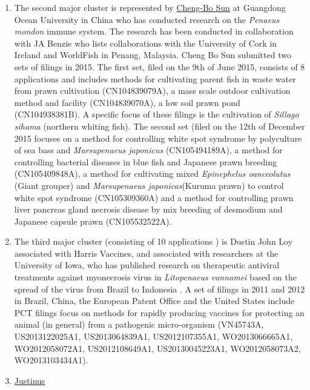 \documentclass[]{book}
\theoremstyle{definition}
\theoremstyle{definition}
\theoremstyle{definition}
\theoremstyle{remark}
\begin{document}
\begin{enumerate}
\def\labelenumi{\arabic{enumi}.}
\setcounter{enumi}{1}
\item
  The second major cluster is represented by
  \href{https://www.researchgate.net/scientific-contributions/2040070693_Cheng-Bo_Sun}{Cheng-Bo
  Sun} at Guangdong Ocean University in China who has conducted research
  on the \emph{Penaeus mondon} immune system. The research has been
  conducted in collaboration with JA Benzie who lists collaborations
  with the University of Cork in Ireland and WorldFish in Penang,
  Malaysia. Cheng Bo Sun submitted two sets of filings in 2015. The
  first set, filed on the 9th of June 2015, consists of 8 applications
  and includes methods for cultivating parent fish in waste water from
  prawn cultivation (CN104839079A), a mass scale outdoor cultivation
  method and facility (CN104839070A), a low soil prawn pond
  (CN104938381B). A specific focus of these filings is the cultivation
  of \emph{Sillago sihama} (northern whiting fish). The second set
  (filed on the 12th of December 2015 focuses on a method for
  controlling white spot syndrome by polyculture of sea bass and
  \emph{Marsupenaeus japonicus} (CN105494189A), a method for controlling
  bacterial diseases in blue fish and Japanese prawn breeding
  (CN105409848A), a method for cultivating mixed \emph{Epinephelus
  oanceolutus} (Giant grouper) and \emph{Marsupenaeus japonicas}(Kuruma
  prawn) to control white spot syndrome (CN105309360A) and a method for
  controlling prawn liver pancreas gland necrosis disease by mix
  breeding of desmodium and Japanese capsule prawn (CN105532522A).
\item
  The third major cluster (consisting of 10 applications ) is Dustin
  John Loy associated with Harris Vaccines, and associated with
  researchers at the University of Iowa, who has published research on
  therapeutic antiviral treatments against myonecrosis virus in
  \emph{Litopenaeus vannamei} based on the spread of the virus from
  Brazil to Indonesia \citep{Loy_2012, Loy_2013}. A set of filings in
  2011 and 2012 in Brazil, China, the European Patent Office and the
  United States include PCT filings focus on methods for rapidly
  producing vaccines for protecting an animal (in general) from a
  pathogenic micro-organism (VN45743A, US2013122025A1, US2013064839A1,
  US2012107355A1, WO2013066665A1, WO2012058072A1, US2012108649A1,
  US20130045223A1, WO2012058073A2, WO2013103434A1).
\item
  \href{https://www.wur.nl/en/Persons/prof.dr.-JM-Just-Vlak.htm}{Justinus
}
\end{enumerate}
\end{document}
